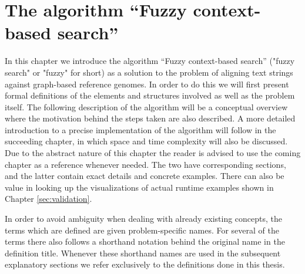\documentclass[thesis.tex]{subfiles}
\begin{document}
\chapter{The algorithm ``Fuzzy context-based search''}
{\parindent0pt
In this chapter we introduce the algorithm ``Fuzzy context-based search'' ("fuzzy search" or "fuzzy" for short) as a solution to the problem of aligning text strings against graph-based reference genomes. In order to do this we will first present formal definitions of the elements and structures involved as well as the problem itself. The following description of the algorithm will be a conceptual overview where the motivation behind the steps taken are also described. A more detailed introduction to a precise implementation of the algorithm will follow in the succeeding chapter, in which space and time complexity will also be discussed. Due to the abstract nature of this chapter the reader is advised to use the coming chapter as a reference whenever needed. The two have corresponding sections, and the latter contain exact details and concrete examples. There can also be value in looking up the visualizations of actual runtime examples shown in Chapter \ref{sec:validation}.\\
\par\noindent
In order to avoid ambiguity when dealing with already existing concepts, the terms which are defined are given problem-specific names. For several of the terms there also follows a shorthand notation behind the original name in the definition title. Whenever these shorthand names are used in the subsequent explanatory sections we refer exclusively to the definitions done in this thesis.
}
\end{document}

